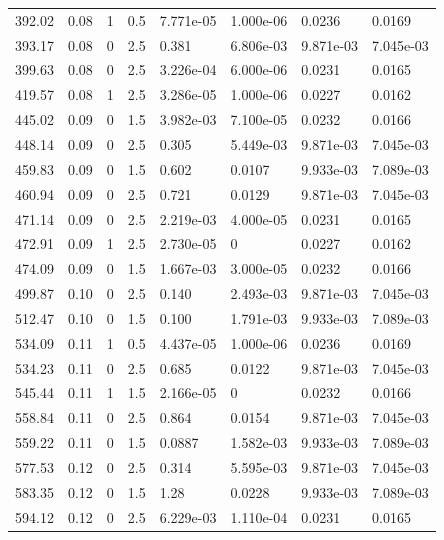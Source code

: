 \documentclass[preview]{standalone}
\begin{document}
{{{\begin{tabular}{L{1.2cm}C{1.2cm} C{0.3cm}C{0.5cm} C{1.4cm}C{1.4cm} C{1.4cm}C{1.4cm}}
  392.02  &  0.08  & 1     & 0.5 &  7.771e-05  & 1.000e-06  & 0.0236 &  0.0169   \\ 
  393.17  &  0.08  & 0     & 2.5 &  0.381  & 6.806e-03  & 9.871e-03 &  7.045e-03   \\ 
  399.63  &  0.08  & 0     & 2.5 &  3.226e-04  & 6.000e-06  & 0.0231 &  0.0165   \\ 
  419.57  &  0.08  & 1     & 2.5 &  3.286e-05  & 1.000e-06  & 0.0227 &  0.0162   \\ 
  445.02  &  0.09  & 0     & 1.5 &  3.982e-03  & 7.100e-05  & 0.0232 &  0.0166   \\ 
  448.14  &  0.09  & 0     & 2.5 &  0.305  & 5.449e-03  & 9.871e-03 &  7.045e-03   \\ 
  459.83  &  0.09  & 0     & 1.5 &  0.602  & 0.0107  & 9.933e-03 &  7.089e-03   \\ 
  460.94  &  0.09  & 0     & 2.5 &  0.721  & 0.0129  & 9.871e-03 &  7.045e-03   \\ 
  471.14  &  0.09  & 0     & 2.5 &  2.219e-03  & 4.000e-05  & 0.0231 &  0.0165   \\ 
  472.91  &  0.09  & 1     & 2.5 &  2.730e-05  & 0  & 0.0227 &  0.0162   \\ 
  474.09  &  0.09  & 0     & 1.5 &  1.667e-03  & 3.000e-05  & 0.0232 &  0.0166   \\ 
  499.87  &  0.10  & 0     & 2.5 &  0.140  & 2.493e-03  & 9.871e-03 &  7.045e-03   \\ 
  512.47  &  0.10  & 0     & 1.5 &  0.100  & 1.791e-03  & 9.933e-03 &  7.089e-03   \\ 
  534.09  &  0.11  & 1     & 0.5 &  4.437e-05  & 1.000e-06  & 0.0236 &  0.0169   \\ 
  534.23  &  0.11  & 0     & 2.5 &  0.685  & 0.0122  & 9.871e-03 &  7.045e-03   \\ 
  545.44  &  0.11  & 1     & 1.5 &  2.166e-05  & 0  & 0.0232 &  0.0166   \\ 
  558.84  &  0.11  & 0     & 2.5 &  0.864  & 0.0154  & 9.871e-03 &  7.045e-03   \\ 
  559.22  &  0.11  & 0     & 1.5 &  0.0887  & 1.582e-03  & 9.933e-03 &  7.089e-03   \\ 
  577.53  &  0.12  & 0     & 2.5 &  0.314  & 5.595e-03  & 9.871e-03 &  7.045e-03   \\ 
  583.35  &  0.12  & 0     & 1.5 &  1.28  & 0.0228  & 9.933e-03 &  7.089e-03   \\ 
  594.12  &  0.12  & 0     & 2.5 &  6.229e-03  & 1.110e-04  & 0.0231 &  0.0165   \\ 

\end{tabular}}}}
\end{document}
